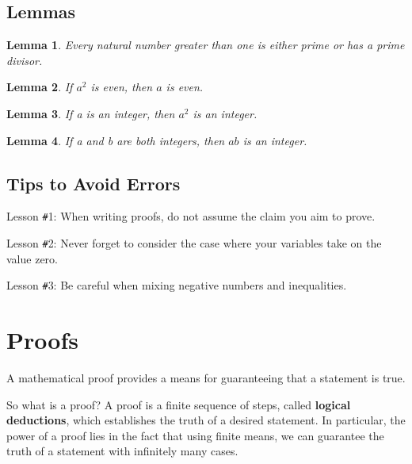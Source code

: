 \documentclass[12pt,a4paper]{article}
\newtheorem{lemma}{Lemma}[section]
\theoremstyle{definition}
\begin{document}
\subsection*{Lemmas}

\begin{lemma}
Every natural number greater than one is either prime or has a prime divisor.
\end{lemma}

\begin{lemma}
If $a^2$ is even, then $a$ is even.
\end{lemma}

\begin{lemma}
If a is an integer, then $a^2$ is an integer.
\end{lemma}

\begin{lemma}
If a and b are both integers, then $ab$ is an integer.
\end{lemma}

\subsection*{Tips to Avoid Errors}

Lesson \texttt{\#}1: When writing proofs, do not assume the claim you aim to prove.

\bigbreak

Lesson \texttt{\#}2: Never forget to consider the case where your variables take on the value zero.

\bigbreak

Lesson \texttt{\#}3: Be careful when mixing negative numbers and inequalities.

\setcounter{theorem}{0}
\setcounter{lemma}{0}

\newpage

\section*{Proofs}

A mathematical proof provides a means for guaranteeing that a statement is true. 

\bigbreak

So what is a proof? A proof is a finite sequence of steps, called \textbf{logical deductions}, which establishes the truth of a desired statement. In particular, the power of a proof lies in the fact that using finite means, we can guarantee the truth of a statement with infinitely many cases.
\end{document}
